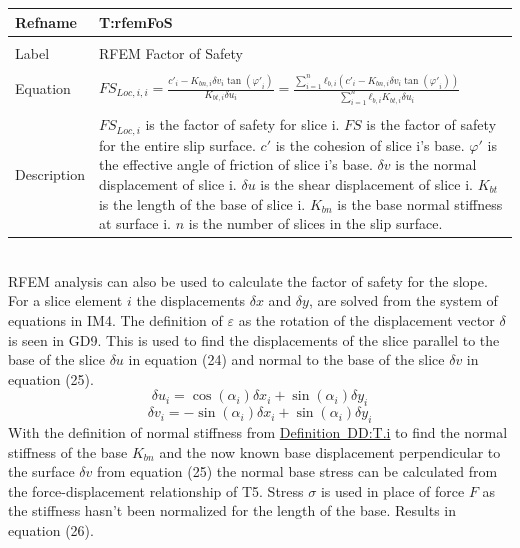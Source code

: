 \documentclass[12pt]{article}
\begin{document}
\noindent \begin{minipage}{\textwidth}
\begin{tabular}{p{} p{}}
\toprule \textbf{Refname} & \textbf{T:rfemFoS}
\label{T:rfemFoS}
\\ \midrule \\
Label & RFEM Factor of Safety
\\ \midrule \\
Equation & ${FS_{Loc,i,i}}=\frac{{c'}_{i}-{K_{bn,i}} {δv}_{i} \tan\left({φ'}_{i}\right)}{{K_{bt,i}} {δu}_{i}}=\frac{\displaystyle\sum_{i=1}^{n}{{ℓ_{b,i}} \left({c'}_{i}-{K_{bn,i}} {δv}_{i} \tan\left({φ'}_{i}\right)\right)}}{\displaystyle\sum_{i=1}^{n}{{ℓ_{b,i}} {K_{bt,i}} {δu}_{i}}}$
\\ \midrule \\
Description & ${FS_{Loc,i}}$ is the factor of safety for slice i. $FS$ is the factor of safety for the entire slip surface. $c'$ is the cohesion of slice i's base. $φ'$ is the effective angle of friction of slice i's base. $δv$ is the normal displacement of slice i. $δu$ is the shear displacement of slice i. ${K_{bt}}$ is the length of the base of slice i. ${K_{bn}}$ is the base normal stiffness at surface i. $n$ is the number of slices in the slip surface.
\\ \bottomrule \end{tabular}
\end{minipage}\\
RFEM analysis can also be used to calculate the factor of safety for the slope. For a slice element $i$ the displacements $δx$ and $δy$, are solved from the system of equations in IM4. The definition of $ε$ as the rotation of the displacement vector $δ$ is seen in GD9. This is used to find the displacements of the slice parallel to the base of the slice $δu$ in equation (24) and normal to the base of the slice $δv$ in equation (25).
\begin{dmath}
{δu}_{i}=\cos\left(α_{i}\right) {δx}_{i}+\sin\left(α_{i}\right) {δy}_{i}
\end{dmath}
\begin{dmath}
{δv}_{i}=-\sin\left(α_{i}\right) {δx}_{i}+\sin\left(α_{i}\right) {δy}_{i}
\end{dmath}
With the definition of normal stiffness from \hyperref[DD:T.i]{Definition~DD:T.i} to find the normal stiffness of the base ${K_{bn}}$ and the now known base displacement perpendicular to the surface $δv$ from equation (25) the normal base stress can be calculated from the force-displacement relationship of T5. Stress $σ$ is used in place of force $F$ as the stiffness hasn't been normalized for the length of the base. Results in equation (26).
\end{document}
